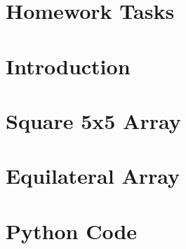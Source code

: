 \documentclass[10pt, a4paper]{article}
\begin{document}


\section*{Homework Tasks}

\pagebreak

\section{Introduction}


\section{Square 5x5 Array}


\section{Equilateral Array}


\pagebreak


\printbibheading
\begin{refsection}
\nocite{*}
\printbibliography[heading=subbibliography,title={Literature}]
\end{refsection}

\begin{refsection}
\nocite{*}
\printbibliography[heading=subbibliography,title={Software Used}]
\end{refsection}

\begin{refsection}
\nocite{*}
\printbibliography[heading=subbibliography,title={Web}]
\end{refsection}

\pagebreak
\appendix
\section{Python Code}\label{app:script}
\inputminted{python}{./code/square-array.py}
\end{document}
